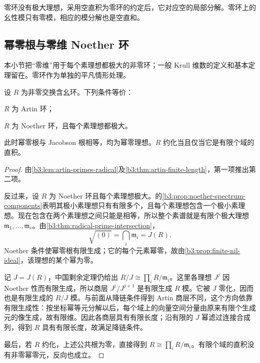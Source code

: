 零环没有极大理想，采用空直积为零环的约定后，它对应空的局部分解。零环上的幺性模只有零模，相应的模分解也是空直和。

\subsection{幂零根与零维 Noether 环}
\label{b3:subsec:0303:03}

本小节把“零维”用于每个素理想都极大的非零环；一般 Krull 维数的定义和基本定理留在。零环作为单独的平凡情形处理。

\begin{theorem}\label{b3:thm:noether-dimension-zero}
	设 \(R\) 为非零交换含幺环。下列条件等价：
	\begin{equivalences}
		\item \(R\) 为 Artin 环；
		\item \(R\) 为 Noether 环，且每个素理想都极大。
	\end{equivalences}
	此时幂零根与 Jacobson 根相等，均为幂零理想。\(R\) 约化当且仅当它是有限个域的直积。
\end{theorem}
\begin{proof}
	由\cref{b3:lem:artin-primes-radical}及\cref{b3:thm:artin-finite-length}，第一项推出第二项。

	反过来，设 \(R\) 为 Noether 环且每个素理想极大。的\cref{b3:prop:noether-spectrum-components}表明其极小素理想只有有限多个，且每个素理想包含一个极小素理想。现在包含在两个素理想之间只能是相等，所以整个素谱就是有限个极大理想 \(\mathfrak m_1,\ldots,\mathfrak m_r\)。由\cref{b3:thm:radical-prime-intersection}，
	\[
		\sqrt{(0)}=\bigcap_i\mathfrak m_i=J(R).
	\]
	Noether 条件使幂零根有限生成；它的每个元素幂零，故由\cref{b3:prop:finite-nil-ideal}，该理想的某个幂为零。

	记 \(J=J(R)\)，中国剩余定理仍给出 \(R/J\cong\prod_i R/\mathfrak m_i\)。这里各理想 \(J^j\) 因 Noether 性而有限生成，所以商层 \(J^j/J^{j+1}\) 是有限生成 \(R\) 模。它被 \(J\) 零化，因而也是有限生成的 \(R/J\) 模。与前面从降链条件得到 Artin 商层不同，这个方向依靠有限生成性：按坐标幂等元分解以后，每个域上的向量空间分量由原来有限个生成元的像生成，故有限维。因此各商层具有有限长度；沿有限的 \(J\) 幂滤过连接合成列，得到 \(R\) 具有有限长度，故满足降链条件。

	最后，若 \(R\) 约化，上述公共根为零，直接得到 \(R\cong\prod_i R/\mathfrak m_i\)。有限个域的直积没有非零幂零元，反向也成立。
\end{proof}

